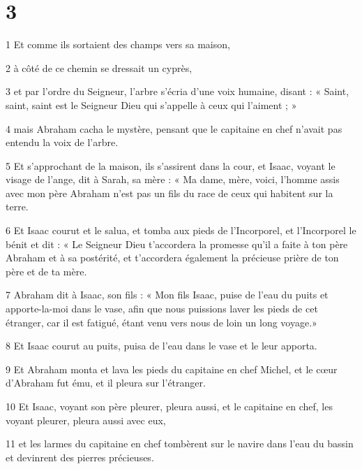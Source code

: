 \chapter{3}

\par 1 Et comme ils sortaient des champs vers sa maison,

\par 2 à côté de ce chemin se dressait un cyprès,

\par 3 et par l'ordre du Seigneur, l'arbre s'écria d'une voix humaine, disant : « Saint, saint, saint est le Seigneur Dieu qui s'appelle à ceux qui l'aiment ; »

\par 4 mais Abraham cacha le mystère, pensant que le capitaine en chef n'avait pas entendu la voix de l'arbre.

\par 5 Et s'approchant de la maison, ils s'assirent dans la cour, et Isaac, voyant le visage de l'ange, dit à Sarah, sa mère : « Ma dame, mère, voici, l'homme assis avec mon père Abraham n'est pas un fils du race de ceux qui habitent sur la terre.

\par 6 Et Isaac courut et le salua, et tomba aux pieds de l'Incorporel, et l'Incorporel le bénit et dit : « Le Seigneur Dieu t'accordera la promesse qu'il a faite à ton père Abraham et à sa postérité, et t'accordera également la précieuse prière de ton père et de ta mère.

\par 7 Abraham dit à Isaac, son fils : « Mon fils Isaac, puise de l'eau du puits et apporte-la-moi dans le vase, afin que nous puissions laver les pieds de cet étranger, car il est fatigué, étant venu vers nous de loin un long voyage.»

\par 8 Et Isaac courut au puits, puisa de l'eau dans le vase et le leur apporta.

\par 9 Et Abraham monta et lava les pieds du capitaine en chef Michel, et le cœur d'Abraham fut ému, et il pleura sur l'étranger.

\par 10 Et Isaac, voyant son père pleurer, pleura aussi, et le capitaine en chef, les voyant pleurer, pleura aussi avec eux,

\par 11 et les larmes du capitaine en chef tombèrent sur le navire dans l'eau du bassin et devinrent des pierres précieuses.

